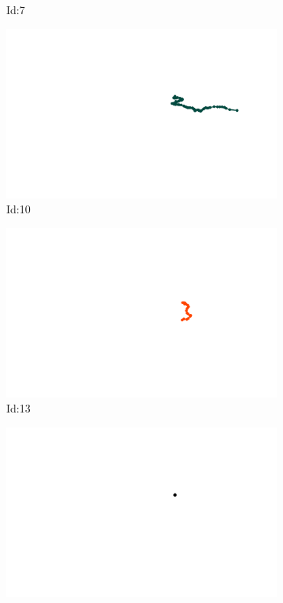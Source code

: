 \documentclass[12pt,twoside]{report}
\begin{document}
\begin{figure}
\begin{subfigure}[b]{0.20\textwidth}
\caption{Id:7}
\end{subfigure}
\begin{subfigure}[b]{0.20\textwidth}
\centering
\includegraphics[width=\textwidth]{../trajectories/10.png}
\caption{Id:10}
\end{subfigure}
\begin{subfigure}[b]{0.20\textwidth}
\centering
\includegraphics[width=\textwidth]{../trajectories/13.png}
\caption{Id:13}
\end{subfigure}
\begin{subfigure}[b]{0.20\textwidth}
\centering
\includegraphics[width=\textwidth]{../trajectories/14.png}

\end{subfigure}
\end{figure}
\end{document}
